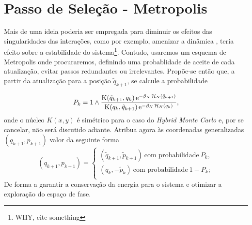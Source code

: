 \section{Passo de Seleção - Metropolis}

Mais de uma ideia poderia ser empregada para diminuir os efeitos das singularidades das interações, como por exemplo, amenizar a dinâmica \cite{bibid}, teria efeito sobre a estabilidade do sistema\footnote{WHY, cite something}. Contudo, usaremos um esquema de Metropolis onde procuraremos, definindo uma probablidade de aceite de cada atualização, evitar passos redundantes ou irrelevantes. Propõe-se então \cite{Chafa2018} que, a partir da atualização para a posição $\tilde{q}_{k+1}$, se calcule a probabilidade

\begin{equation}
P_k = 1 \wedge \frac{\operatorname{K}(\tilde{q}_{k+1}, q_k) \operatorname{\textrm e}^{-\beta_N \operatorname{\mathcal{H}}_N(\tilde{q}_{k+1})}}{\operatorname{K}(q_k, \tilde{q}_{k+1}) \operatorname{\textrm e}^{-\beta_N \operatorname{\mathcal{H}}_N(q_{k})}},
\label{Equation: Pk}
\end{equation}
onde o núcleo $K(x, y)$ é simétrico \cite{Chafa2018} para o caso do \textit{Hybrid Monte Carlo} e, por se cancelar, não será discutido adiante. Atribua agora às coordenadas generalizadas $(q_{k+1}, p_{k+1})$ valor da seguinte forma
\begin{equation}
	(q_{k+1}, p_{k+1}) =
\begin{cases}
	(\tilde{q}_{k+1}, \tilde{p}_{k+1}) \ \text{com probabilidade} \ P_k, \\
	(q_k, -\tilde{p}_{k}) \ \text{com probabilidade} \ 1-P_k; \\
\end{cases}
\label{Equation: Metropolis}
\end{equation}
De forma a garantir a conservação da energia para o sistema e otimizar a exploração do espaço de fase.
